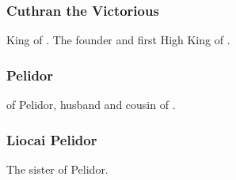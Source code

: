 
\part[Scathae]{\Scathae}
\chapter{\Velcadians}















\section{Cuthran the Victorious}
King of \Vidra. 
The founder and first High King of . 















\section{\Icor Pelidor}
\Rayuth of Pelidor, husband and cousin of . 















\section{Liocai Pelidor}
The sister of \Icor{} Pelidor. 









